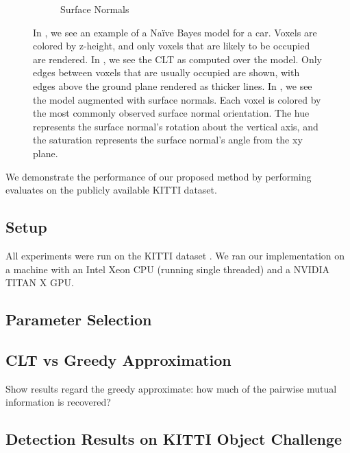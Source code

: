 \begin{figure}
\begin{subfigure}[]{0.3\linewidth}
    \caption{Surface Normals}
    \label{fig:sn}
  \end{subfigure}
  \caption{In , we see an example of a Na\"ive Bayes model for a
    car. Voxels are colored by z-height, and only voxels that are likely to be
    occupied are rendered. In , we see the \ac{CLT} as computed
    over the model. Only edges between voxels that are usually occupied are
    shown, with edges above the ground plane rendered as thicker lines. In
    , we see the model augmented with surface normals. Each voxel
    is colored by the most commonly observed surface normal orientation. The hue
    represents the surface normal's rotation about the vertical axis, and the
    saturation represents the surface normal's angle from the xy plane.}
\end{figure}

We demonstrate the performance of our proposed method by performing evaluates on the
publicly available KITTI dataset.

\subsection{Setup}

All experiments were run on the KITTI dataset \cite{Geiger2013IJRR}. We ran our
implementation on a machine with an Intel Xeon CPU (running single threaded) and a
NVIDIA TITAN X \ac{GPU}.

\subsection{Parameter Selection}

\aku{\ldots}

\subsection{CLT vs Greedy Approximation}

Show results regard the greedy approximate: how much of the pairwise mutual
information is recovered?

\subsection{Detection Results on KITTI Object Challenge}

